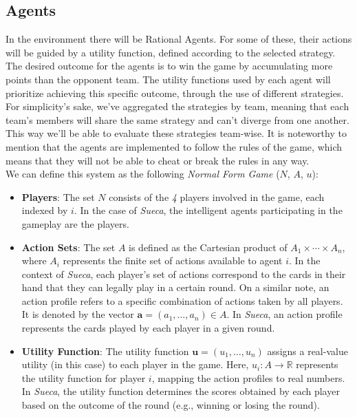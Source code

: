 \documentclass[sigconf]{acmart}
\begin{document}
\subsection{Agents}
In the environment there will be Rational Agents. For some of these, their actions will be guided by a utility function, defined according to the selected strategy.
The desired outcome for the agents is to win the game by accumulating more points than the opponent team. The utility functions used by each agent will prioritize achieving this specific outcome, through the use of different strategies.\\

\noindent For simplicity's sake, we've aggregated the strategies by team, meaning that each team's members will share the same strategy and can't diverge from one another. This way we'll be able to evaluate these strategies team-wise. It is noteworthy to mention that the agents are implemented to follow the rules of the game, which means that they will not be able to cheat or break the rules in any way.\\

\noindent We can define this system as the following \textit{Normal Form Game} ($N$, $A$, $u$):

\begin{itemize}
  \item \textbf{Players}: The set $N$ consists of the \textit{4} players involved in the game, each indexed by $i$. In the case of \textit{Sueca}, the intelligent agents participating in the gameplay are the players.\\

  \item \textbf{Action Sets}: The set $A$ is defined as the Cartesian product of $A_1 \times \cdots \times A_n$, where $A_i$ represents the finite set of actions available to agent $i$. In the context of \textit{Sueca}, each player's set of actions correspond to the cards in their hand that they can legally play in a certain round. On a similar note, an action profile refers to a specific combination of actions taken by all players. It is denoted by the vector $\mathbf{a} = (a_1, \ldots, a_n) \in A$. In \textit{Sueca}, an action profile represents the cards played by each player in a given round.\\

  \item \textbf{Utility Function}: The utility function $\mathbf{u} = (u_1, \ldots, u_n)$ assigns a real-value utility (in this case) to each player in the game. Here, $u_i: A \rightarrow \mathbb{R}$ represents the utility function for player $i$, mapping the action profiles to real numbers. In \textit{Sueca}, the utility function determines the scores obtained by each player based on the outcome of the round (e.g., winning or losing the round).
\end{itemize}
\end{document}
